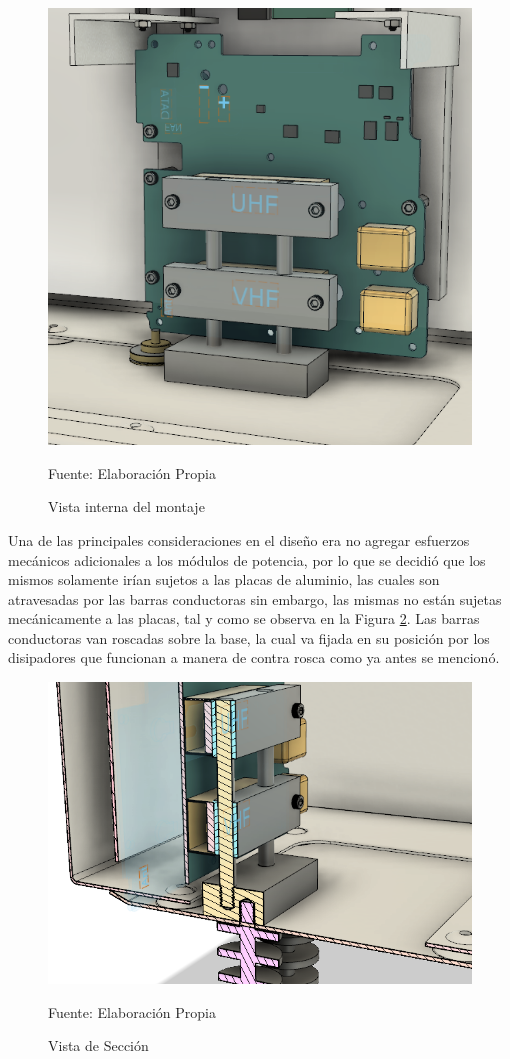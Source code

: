 \begin{figure}[H]
\centering
\includegraphics[scale=0.45]{Figuras/G11.png}
\caption{Vista interna del montaje}
Fuente: Elaboración Propia
\label{solucion2}
\end{figure}

Una de las principales consideraciones en el diseño era no agregar esfuerzos mecánicos adicionales a los módulos de potencia, por lo que se decidió que los mismos solamente irían sujetos a las placas de aluminio, las cuales son atravesadas por las barras conductoras sin embargo, las mismas no están sujetas mecánicamente a las placas, tal y como se observa en la Figura \ref{solucion3}. Las barras conductoras van roscadas sobre la base, la cual va fijada en su posición por los disipadores que funcionan a manera de contra rosca como ya antes se mencionó.\\

\begin{figure}[H]
\centering
\includegraphics[scale=0.5]{Figuras/G12.png}
\caption{Vista de Sección}
Fuente: Elaboración Propia
\label{solucion3}
\end{figure}  %

